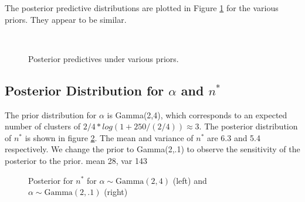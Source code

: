 \documentclass{article}
\def\beginmyfig{\begin{figure}[h]\begin{center}}
\def\endmyfig{\end{center}\end{figure}}
\begin{document}

\noindent
The posterior predictive distributions are plotted in Figure
\ref{fig:postpreds1} for the various priors. They appear to be similar.\\
\begin{figure}[h]
  \center
  \hfill
   \\
  \hfill
  \caption{Posterior predictives under various priors.}
  \label{fig:postpreds1}
\end{figure}


\subsection{Posterior Distribution for $\alpha$ and $n^*$}
The prior distribution for $\alpha$ is Gamma(2,4), which corresponds 
to an expected number of clusters of $2/4 * log(1 + 250 /(2/4) ) \approx 3$.
The posterior distribution of $n^*$ is shown in figure \ref{fig:nstar1}.
The mean and variance of $n^*$ are 6.3 and 5.4 respectively. We
change the prior to Gamma(2,.1) to observe the sensitivity of the posterior
to the prior.
mean 28, var 143

\beginmyfig
  \caption{Posterior for $n^*$ for $\alpha \sim \text{Gamma}(2,4)$ (left) and
  $\alpha \sim \text{Gamma}(2,.1)$ (right)}
  \label{fig:nstar1}
\endmyfig
\end{document}

